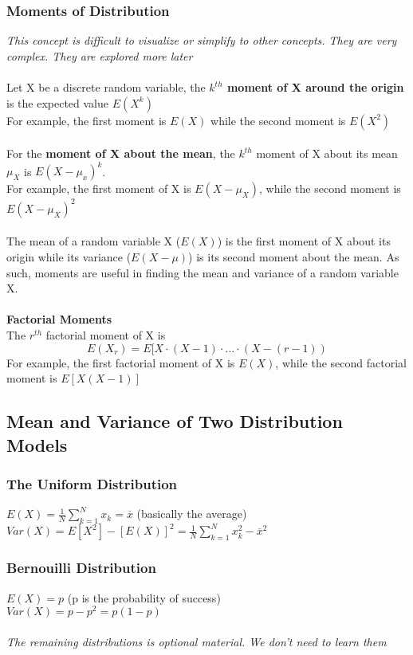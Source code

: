\documentclass{article}
\begin{document}
\subsubsection{Moments of Distribution}
\textit{This concept is difficult to visualize or simplify to other concepts. They are very complex. They are explored more later}\\\\
Let X be a discrete random variable, the \textbf{$k^{th}$ moment of X around the origin} is the expected value $E(X^k)$\\
For example, the first moment is $E(X)$ while the second moment is $E(X^2)$
\\\\
For the \textbf{moment of X about the mean}, the $k^{th}$ moment of X about its mean $\mu_X$ is $E(X-\mu_x)^k$.\\
For example, the first moment of X is $E(X-\mu_X)$, while the second moment is $E(X-\mu_X)^2$
\\\\
The mean of a random variable X ($E(X)$) is the first moment of X about its origin while its variance ($E(X-\mu)$) is its second moment about the mean. As such, moments are useful in finding the mean and variance of a random variable X. 
\\\\
\textbf{Factorial Moments}\\
The $r^{th}$ factorial moment of X is
\[E(X_r)=E[X\cdot(X-1)\cdot...\cdot (X-(r-1))\]
For example, the first factorial moment of X is $E(X)$, while the second factorial moment is $E[X(X-1)]$

\subsection{Mean and Variance of Two Distribution Models}
\subsubsection{The Uniform Distribution}
$E(X)=\frac1N\sum^N_{k=1}x_k=\overline x$ (basically the average)\\
$Var(X)=E[X^2]-[E(X)]^2=\frac1N\sum^N_{k=1}x_k^2-\overline x^2$
\subsubsection{Bernouilli Distribution}
$E(X)=p$ (p is the probability of success)\\
$Var(X)=p-p^2=p(1-p)$\\\\
\textit{The remaining distributions is optional material. We don't need to learn them}
\newpage
\end{document}
